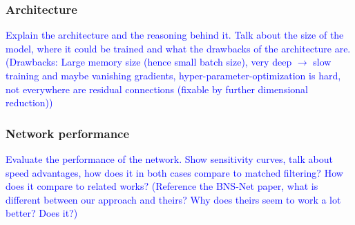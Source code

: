 \subsubsection{Architecture}
\textcolor{blue}{Explain the architecture and the reasoning behind it. Talk about the size of the model, where it could be trained and what the drawbacks of the architecture are. (Drawbacks: Large memory size (hence small batch size), very deep $\to$ slow training and maybe vanishing gradients, hyper-parameter-optimization is hard, not everywhere are residual connections (fixable by further dimensional reduction))}
\subsubsection{Network performance}
\textcolor{blue}{Evaluate the performance of the network. Show sensitivity curves, talk about speed advantages, how does it in both cases compare to matched filtering? How does it compare to related works? (Reference the BNS-Net paper, what is different between our approach and theirs? Why does theirs seem to work a lot better? Does it?)}
